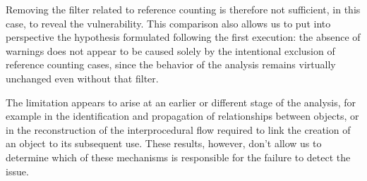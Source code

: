 Removing the filter related to reference counting is therefore not sufficient, in this case, to reveal the vulnerability. This comparison also allows us to put into perspective the hypothesis formulated following the first execution: the absence of warnings does not appear to be caused solely by the intentional exclusion of reference counting cases, since the behavior of the analysis remains virtually unchanged even without that filter.

The limitation appears to arise at an earlier or different stage of the analysis, for example in the identification and propagation of relationships between objects, or in the reconstruction of the interprocedural flow required to link the creation of an object to its subsequent use. These results, however, don't allow us to determine which of these mechanisms is responsible for the failure to detect the issue.